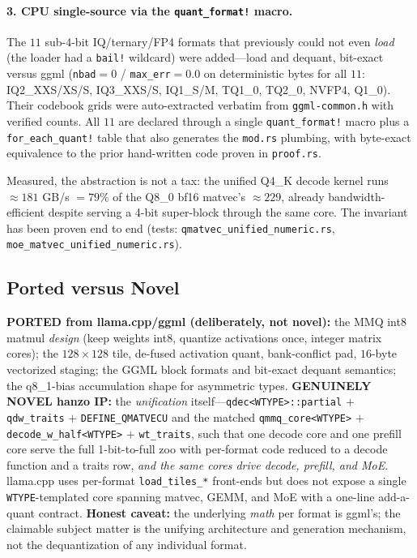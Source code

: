 \documentclass[11pt]{article}
\begin{document}
\paragraph{3. CPU single-source via the \texttt{quant\_format!} macro.} The $11$ sub-4-bit IQ/ternary/FP4 formats that previously could not even \emph{load} (the loader had a \texttt{bail!} wildcard) were added---load and dequant, bit-exact versus ggml (\texttt{nbad}$=0$ / \texttt{max\_err}$=0.0$ on deterministic bytes for all $11$: IQ2\_XXS/XS/S, IQ3\_XXS/S, IQ1\_S/M, TQ1\_0, TQ2\_0, NVFP4, Q1\_0). Their codebook grids were auto-extracted verbatim from \texttt{ggml-common.h} with verified counts. All $11$ are declared through a single \texttt{quant\_format!} macro plus a \texttt{for\_each\_quant!} table that also generates the \texttt{mod.rs} plumbing, with byte-exact equivalence to the prior hand-written code proven in \texttt{proof.rs}.

Measured, the abstraction is not a tax: the unified Q4\_K decode kernel runs $\approx 181$ GB/s $=79\%$ of the Q8\_0 bf16 matvec's $\approx 229$, already bandwidth-efficient despite serving a 4-bit super-block through the same core. The invariant has been proven end to end (tests: \texttt{qmatvec\_unified\_numeric.rs}, \texttt{moe\_matvec\_unified\_numeric.rs}).

\subsection{Ported versus Novel}

\textbf{PORTED from llama.cpp/ggml (deliberately, not novel):} the MMQ int8 matmul \emph{design} (keep weights int8, quantize activations once, integer matrix cores); the $128{\times}128$ tile, de-fused activation quant, bank-conflict pad, $16$-byte vectorized staging; the GGML block formats and bit-exact dequant semantics; the q8\_1-bias accumulation shape for asymmetric types. \textbf{GENUINELY NOVEL hanzo IP:} the \emph{unification} itself---\texttt{qdec<WTYPE>::partial} $+$ \texttt{qdw\_traits} $+$ \texttt{DEFINE\_QMATVECU} and the matched \texttt{qmmq\_core<WTYPE>} $+$ \texttt{decode\_w\_half<WTYPE>} $+$ \texttt{wt\_traits}, such that one decode core and one prefill core serve the full 1-bit-to-full zoo with per-format code reduced to a decode function and a traits row, \emph{and the same cores drive decode, prefill, and MoE}. llama.cpp uses per-format \texttt{load\_tiles\_*} front-ends but does not expose a single \texttt{WTYPE}-templated core spanning matvec, GEMM, and MoE with a one-line add-a-quant contract. \textbf{Honest caveat:} the underlying \emph{math} per format is ggml's; the claimable subject matter is the unifying architecture and generation mechanism, not the dequantization of any individual format.
\end{document}
